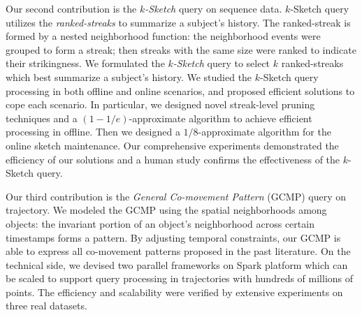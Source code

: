 Our second contribution is the \emph{$k$-Sketch} query on sequence data.
$k$-Sketch query utilizes the \emph{ranked-streaks} to
summarize a subject's history.
The ranked-streak is formed
by a nested neighborhood function: the neighborhood events were grouped to form a streak; then streaks with the same size were ranked to indicate their strikingness.
%
We formulated the \emph{$k$-Sketch} query to select $k$ ranked-streaks which best summarize a subject's history.
We studied the $k$-Sketch query processing in both offline and online scenarios,
and proposed efficient solutions to cope each scenario. In particular, we designed novel streak-level pruning techniques and a $(1-1/e)$-approximate algorithm to achieve efficient processing in offline. Then we designed a $1/8$-approximate algorithm for the online sketch maintenance.
Our comprehensive experiments demonstrated the efficiency of our solutions and a human study confirms the effectiveness of the $k$-Sketch query.


Our third contribution is the \emph{General Co-movement Pattern} (GCMP) query on trajectory.
We modeled the GCMP using the spatial neighborhoods among objects:
the invariant portion of an object's neighborhood across certain timestamps
forms a pattern.
By adjusting temporal constraints, our GCMP is able
to express all co-movement patterns proposed in the past literature.
% 
On the technical side, we  devised two parallel frameworks on Spark platform which can be scaled to 
support query processing in trajectories with hundreds of millions of points. 
The efficiency and scalability were verified by extensive experiments on three real datasets.
%
%
%
%
%
%

